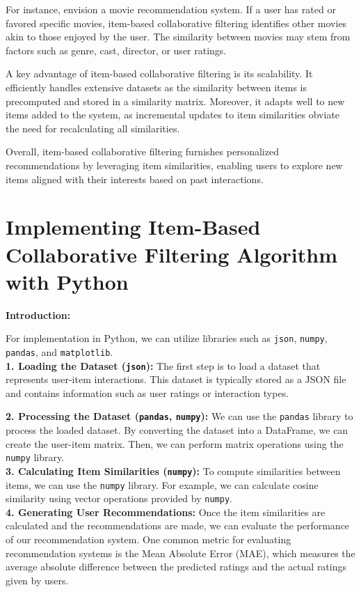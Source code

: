 \documentclass[conference]{IEEEtran}
\begin{document}
	For instance, envision a movie recommendation system. If a user has rated or favored specific movies, item-based collaborative filtering identifies other movies akin to those enjoyed by the user. The similarity between movies may stem from factors such as genre, cast, director, or user ratings.
	
	A key advantage of item-based collaborative filtering is its scalability. It efficiently handles extensive datasets as the similarity between items is precomputed and stored in a similarity matrix. Moreover, it adapts well to new items added to the system, as incremental updates to item similarities obviate the need for recalculating all similarities.
	
	Overall, item-based collaborative filtering furnishes personalized recommendations by leveraging item similarities, enabling users to explore new items aligned with their interests based on past interactions.
	
	
	\section{Implementing Item-Based Collaborative Filtering Algorithm with Python}
	
	\textbf{Introduction:}
	
	For implementation in Python, we can utilize libraries such as \texttt{json}, \texttt{numpy}, \texttt{pandas}, and \texttt{matplotlib}.\\
	
	\textbf{1. Loading the Dataset (\texttt{json}):} The first step is to load a dataset that represents user-item interactions. This dataset is typically stored as a JSON file and contains information such as user ratings or interaction types.
	
	\textbf{2. Processing the Dataset (\texttt{pandas}, \texttt{numpy}):} We can use the \texttt{pandas} library to process the loaded dataset. By converting the dataset into a DataFrame, we can create the user-item matrix. Then, we can perform matrix operations using the \texttt{numpy} library.\\
	
	\textbf{3. Calculating Item Similarities (\texttt{numpy}):} To compute similarities between items, we can use the \texttt{numpy} library. For example, we can calculate cosine similarity using vector operations provided by \texttt{numpy}.\\
	
	\textbf{4. Generating User Recommendations:} Once the item similarities are calculated and the recommendations are made, we can evaluate the performance of our recommendation system. One common metric for evaluating recommendation systems is the Mean Absolute Error (MAE), which measures the average absolute difference between the predicted ratings and the actual ratings given by users.
	
\end{document}
